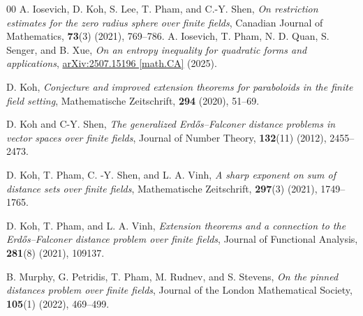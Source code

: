 \documentclass[11pt]{article}
\begin{document}
\begin{thebibliography}{00}
A. Iosevich, D. Koh, S. Lee, T. Pham, and C.-Y. Shen, \textit{On restriction estimates for the zero radius sphere over finite fields}, Canadian Journal of Mathematics, \textbf{73}(3) (2021), 769--786.
A. Iosevich, T. Pham, N. D. Quan, S. Senger, and B.  Xue, \textit{On an entropy inequality for quadratic forms and applications}, 
\href{https://arxiv.org/abs/2507.15196}
{arXiv:2507.15196 [math.CA]} (2025).

D. Koh, \textit{Conjecture and improved extension theorems for paraboloids in the finite field setting}, Mathematische Zeitschrift, \textbf{294} (2020), 51--69.

D. Koh and C-Y. Shen, \textit{The generalized Erd\H{o}s–Falconer distance problems in vector spaces over finite fields}, Journal of Number Theory, \textbf{132}(11) (2012), 2455--2473.

D. Koh, T. Pham, C. -Y. Shen, and L. A. Vinh, \textit{A sharp exponent on sum of distance sets over finite fields}, Mathematische Zeitschrift, \textbf{297}(3)  (2021), 1749--1765.

D. Koh, T. Pham, and L. A. Vinh, \textit{Extension theorems and a connection to the Erd\H{o}s--Falconer distance problem over finite fields}, Journal of Functional Analysis, \textbf{281}(8) (2021), 109137.







B. Murphy, G. Petridis, T. Pham, M. Rudnev, and S. Stevens, \textit{On the pinned distances problem over finite fields}, Journal of the London Mathematical Society, \textbf{105}(1) (2022), 469--499.



\end{thebibliography}
\end{document}
